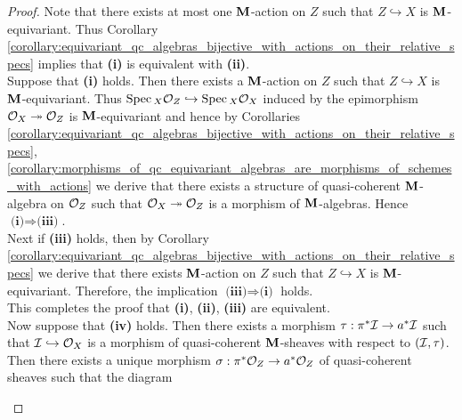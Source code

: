 \begin{proof}
Note that there exists at most one $\mathbf{M}$-action on $Z$ such that $Z\hookrightarrow X$ is $\mathbf{M}$-equivariant. Thus Corollary \ref{corollary:equivariant_qc_algebras_bijective_with_actions_on_their_relative_specs} implies that \textbf{(i)} is equivalent with \textbf{(ii)}.\\
Suppose that \textbf{(i)} holds. Then there exists a $\mathbf{M}$-action on $Z$ such that $Z\hookrightarrow X$ is $\mathbf{M}$-equivariant. Thus $\mathrm{Spec}\,_X {\mathcal O}_Z \hookrightarrow \mathrm{Spec}\,_X {\mathcal O}_X$ induced by the epimorphism ${\mathcal O}_X \twoheadrightarrow {\mathcal O}_Z$ is $\mathbf{M}$-equivariant and hence by Corollaries \ref{corollary:equivariant_qc_algebras_bijective_with_actions_on_their_relative_specs}, \ref{corollary:morphisms_of_qc_equivariant_algebras_are_morphisms_of_schemes_with_actions} we derive that there exists a structure of quasi-coherent $\mathbf{M}$-algebra on ${\mathcal O}_Z$ such that ${\mathcal O}_X \twoheadrightarrow {\mathcal O}_Z$ is a morphism of $\mathbf{M}$-algebras. Hence $\textbf{(i)} \Rightarrow \textbf{(iii)}$.\\
Next if \textbf{(iii)} holds, then by Corollary \ref{corollary:equivariant_qc_algebras_bijective_with_actions_on_their_relative_specs} we derive that there exists $\mathbf{M}$-action on $Z$ such that $Z\hookrightarrow X$ is $\mathbf{M}$-equivariant. Therefore, the implication $\textbf{(iii)}\Rightarrow \textbf{(i)}$ holds.\\
This completes the proof that \textbf{(i)}, \textbf{(ii)}, \textbf{(iii)} are equivalent.\\
Now suppose that \textbf{(iv)} holds. Then there exists a morphism $\tau:\pi^*{\mathcal I}\rightarrow a^*{\mathcal I}$ such that ${\mathcal I} \hookrightarrow {\mathcal O}_X$ is a morphism of quasi-coherent $\mathbf{M}$-sheaves with respect to $({\mathcal I},\tau)$. Then there exists a unique morphism $\sigma:\pi^*{\mathcal O}_Z\rightarrow a^*{\mathcal O}_Z$ of quasi-coherent sheaves such that the diagram
\begin{center}
\end{center}
\end{proof}
